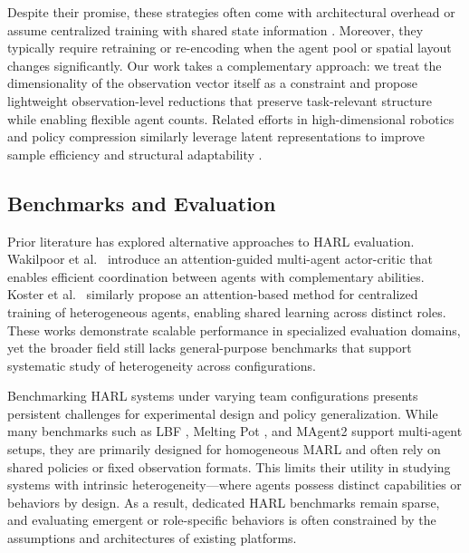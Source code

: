 \documentclass{article}
\begin{document}
Despite their promise, these strategies often come with architectural overhead or assume 
centralized training with shared state information \cite{foerster2017}. 
Moreover, they typically require retraining or re-encoding when the agent pool or spatial 
layout changes significantly. Our work takes a complementary approach: 
we treat the dimensionality of the observation vector itself as a constraint and propose 
lightweight observation-level reductions that preserve task-relevant structure 
while enabling flexible agent counts. 
Related efforts in high-dimensional robotics and policy compression similarly leverage 
latent representations to improve sample efficiency and structural adaptability 
\cite{bitzer2010, tangkaratt2016}.



\subsection{Benchmarks and Evaluation}

Prior literature has explored alternative approaches to HARL evaluation. 
Wakilpoor et al.~\cite{wakilpoor2020} introduce an attention-guided multi-agent actor-critic 
that enables efficient coordination between agents with complementary abilities. 
Koster et al.~\cite{koster2020} similarly propose an attention-based method for centralized 
training of heterogeneous agents, enabling shared learning across distinct roles. 
These works demonstrate scalable performance in specialized evaluation domains, 
yet the broader field still lacks general-purpose benchmarks that support systematic 
study of heterogeneity across configurations.

Benchmarking HARL systems under varying team configurations presents persistent
challenges for experimental design and policy generalization. While many benchmarks 
such as LBF \cite{papoudakis2021}, Melting Pot \cite{leibo2021}, and MAgent2 \cite{zheng2017} 
support multi-agent setups, they are primarily designed for homogeneous MARL 
and often rely on shared policies or fixed observation formats. This limits 
their utility in studying systems with intrinsic heterogeneity—where agents possess 
distinct capabilities or behaviors by design. As a result, dedicated HARL benchmarks 
remain sparse, and evaluating emergent or role-specific behaviors is often constrained 
by the assumptions and architectures of existing platforms.
\end{document}
